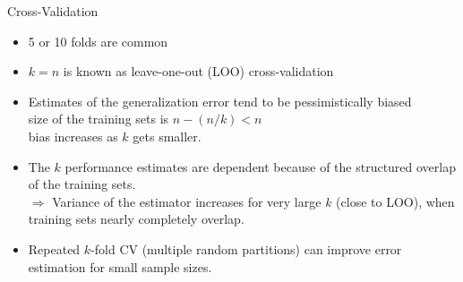 \documentclass[11pt,compress,t,notes=noshow, xcolor=table]{beamer}
\begin{document}
\begin{vbframe}{Cross-Validation}

\begin{itemize}
  \item 5 or 10 folds are common%
  \item $k = n$ is known as leave-one-out (LOO) cross-validation
  \item Estimates of the generalization error tend to be pessimistically biased\\
    size of the training sets is $ n- (n/k) < n$\\
    bias increases as $k$ gets smaller.
  \item The $k$ performance estimates are dependent because
  of the structured overlap of the training sets.\\
  $\Rightarrow$ Variance of the estimator increases for very large $k$ (close to LOO),
  when training sets nearly completely overlap.
  \item Repeated $k$-fold CV (multiple random partitions)
  can improve error estimation for small sample sizes.
\end{itemize}
\end{vbframe}
\end{document}
